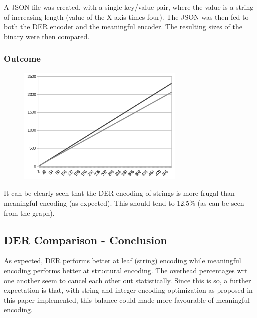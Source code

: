 A JSON file was created, with a single key/value pair, where the value
is a string of increasing length (value of the X-axis times four).
The JSON was then fed to both the DER
encoder and the meaningful encoder. The resulting sizes of the binary were
then compared.

\subsubsection{Outcome}

\begin{figure}[H]
\centering
\includegraphics[width=80mm]{stringcomparison}
\end{figure}

It can be clearly seen that the DER encoding of strings is more
frugal than meaningful encoding (as expected). This should tend to
12.5\% (as can be seen from the graph).

\subsection{DER Comparison - Conclusion}

As expected, DER performs better at leaf (string) encoding while
meaningful encoding performs better at structural encoding.
The overhead percentages wrt one another seem to cancel each other
out statistically. Since this is so, a further expectation is that, with string
and integer encoding optimization as proposed in this paper implemented,
this balance could made more favourable of meaningful encoding.


